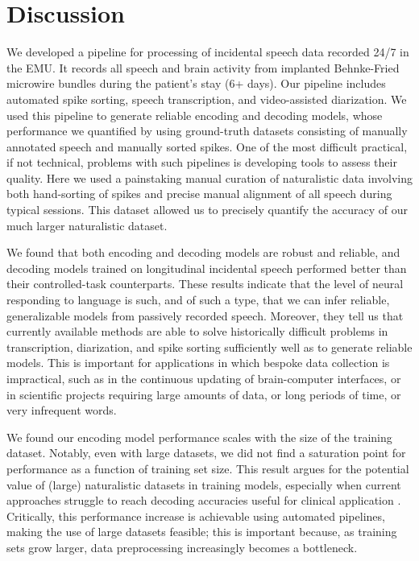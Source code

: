 \documentclass[pdflatex,sn-basic]{sn-jnl}%
\theoremstyle{thmstyleone}%
\theoremstyle{thmstyletwo}%
\theoremstyle{thmstylethree}%
\begin{document}
\clearpage

\section{Discussion}\label{sec10}

We developed a pipeline for processing of incidental speech data recorded 24/7 in the EMU. It records all speech and brain activity from implanted Behnke-Fried microwire bundles during the patient's stay (6+ days). Our pipeline includes automated spike sorting, speech transcription, and video-assisted diarization. We used this pipeline to generate reliable encoding and decoding models, whose performance we quantified by using ground-truth datasets consisting of manually annotated speech and manually sorted spikes. One of the most difficult practical, if not technical, problems with such pipelines is developing tools to assess their quality. Here we used a painstaking manual curation of naturalistic data involving both hand-sorting of spikes and precise manual alignment of all speech during typical sessions. This dataset allowed us to precisely quantify the accuracy of our much larger naturalistic dataset.

We found that both encoding and decoding models are robust and reliable, and decoding models trained on longitudinal incidental speech performed better than their controlled-task counterparts. These results indicate that the level of neural responding to language is such, and of such a type, that we can infer reliable, generalizable models from passively recorded speech. Moreover, they tell us that currently available methods are able to solve historically difficult problems in transcription, diarization, and spike sorting sufficiently well as to generate reliable models. This is important for applications in which bespoke data collection is impractical, such as in the continuous updating of brain-computer interfaces, or in scientific projects requiring large amounts of data, or long periods of time, or very infrequent words.

We found our encoding model performance scales with the size of the training dataset. Notably, even with large datasets, we did not find a saturation point for performance as a function of training set size. This result argues for the potential value of (large) naturalistic datasets in training models, especially when current approaches struggle to reach decoding accuracies useful for clinical application \citep{bib82,bib131,bib132,bib133,bib16,bib17}. Critically, this performance increase is achievable using automated pipelines, making the use of large datasets feasible; this is important because, as training sets grow larger, data preprocessing increasingly becomes a bottleneck.
\end{document}
